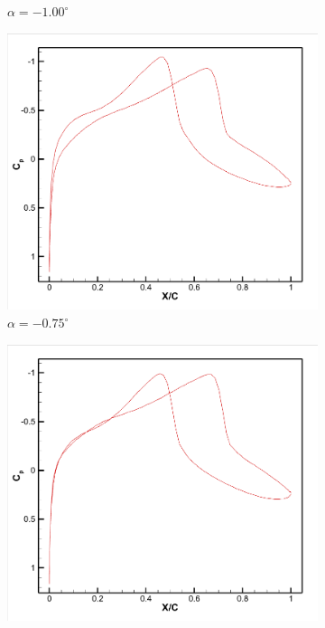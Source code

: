 \begin{figure}[H]
\begin{subfigure}[b]{0.18\textwidth}
\caption{$\alpha=-1.00^\circ$}
\end{subfigure}
\hfill
\begin{subfigure}[b]{0.18\textwidth}
\centering
\includegraphics[width=\linewidth]{3.png}
\caption{$\alpha=-0.75^\circ$}
\end{subfigure}
\hfill
\begin{subfigure}[b]{0.18\textwidth}
\centering
\includegraphics[width=\linewidth]{4.png}

\end{subfigure}
\end{figure}
